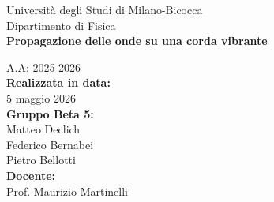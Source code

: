 \documentclass[a4paper,12pt]{article} %
\begin{document}
\begin{titlepage}
    \begin{center}
        \vspace*{1cm}
        \Large{Università degli Studi di Milano-Bicocca}\\
        \Large{Dipartimento di Fisica }\\
        \Huge{\textbf{Propagazione delle onde su una corda vibrante}}
        
        \vspace{1.5cm}
        \large{A.A: 2025-2026}\\
        \vspace{2cm}
        \large{\textbf{Realizzata in data:}}\\
        \large{5 maggio 2026}\\
        \vspace{1cm}
        \large{\textbf{Gruppo Beta 5:}}\\
        \large{Matteo Declich}\\
        \large{Federico Bernabei}\\
        \large{Pietro Bellotti}\\
        \vspace{1cm}
        \large{\textbf{Docente:}}\\
        \large{Prof. Maurizio Martinelli}\\
        
        \vfill
        \vspace{0.8cm}
    \end{center}
\end{titlepage}

\tableofcontents %
\newpage


\nocite{calvi2025}
\printbibliography[heading=bibintoc]
\end{document}
